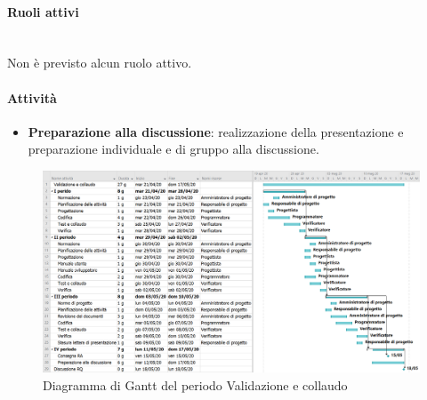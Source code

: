 \paragraph{Ruoli attivi} \mbox{}\\ [1mm]
Non è previsto alcun ruolo attivo.
\paragraph{Attività}

\begin{itemize}
	\item \textbf{Preparazione alla discussione}: realizzazione della presentazione e preparazione individuale e di gruppo alla discussione.
\end{itemize}

\begin{landscape}
	\begin{figure}
		\includegraphics[width=\linewidth]{./gantt/Validazione e collaudo.png}
		\caption{Diagramma di Gantt del periodo Validazione e collaudo}
	\end{figure}
\end{landscape}
\pagebreak
